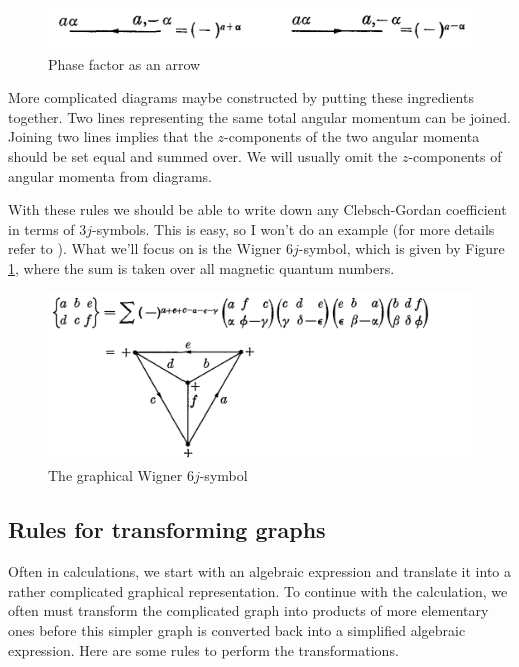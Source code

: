 \documentclass[11pt]{article}
\begin{document}
\begin{appendices}
\begin{figure}[!htb]
	\centering
	\includegraphics[scale=0.7]{j3_graph2}
	\caption{Phase factor as an arrow \cite{angular_momentum}}
\end{figure}
More complicated diagrams maybe constructed by putting these ingredients together. Two lines representing the same total angular momentum can be joined. Joining two lines implies that the $z$-components of the two angular momenta should be set equal and summed over. We will usually omit the $z$-components of angular momenta from diagrams. 

With these rules we should be able to write down any  Clebsch-Gordan coefficient in terms of $3j$-symbols. This is easy, so I won't do an example (for more details refer to \cite{angular_momentum}). What we'll focus on is the Wigner $6j$-symbol, which is given by Figure \ref{fig:6j}, where the sum is taken over all magnetic quantum numbers. 
\begin{figure}[!htb]
	\centering
	\includegraphics[scale=0.7]{j6_graph}
	\caption{The graphical Wigner $6j$-symbol \cite{angular_momentum}}
	\label{fig:6j}
\end{figure}


\subsection{Rules for transforming graphs}
Often in calculations, we start with an algebraic expression and translate it into a rather complicated graphical representation. To continue with the calculation, we often must transform the complicated graph into products of more elementary ones before this simpler graph is converted back into a simplified algebraic expression. Here are some rules to perform the transformations. 


\end{appendices}
\end{document}
